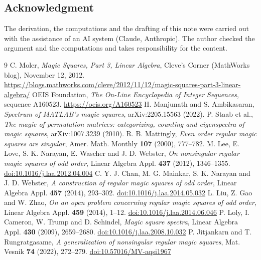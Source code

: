 \documentclass[11pt]{amsart}
\theoremstyle{remark}
\providecommand{\doi}[1]{\href{https://doi.org/#1}{doi:#1}}
\begin{document}
\subsection*{Acknowledgment}
The derivation, the computations and the drafting of this note were carried out with the assistance of an AI system
(Claude, Anthropic). The author checked the argument and the computations and takes responsibility for the content.

\begin{thebibliography}{9}
 C. Moler, \emph{Magic Squares, Part 3, Linear Algebra}, Cleve's Corner (MathWorks blog),
November 12, 2012. \url{https://blogs.mathworks.com/cleve/2012/11/12/magic-squares-part-3-linear-algebra/}
 OEIS Foundation, \emph{The On-Line Encyclopedia of Integer Sequences}, sequence A160523.
\url{https://oeis.org/A160523}
 H. Manjunath and S. Ambikasaran, \emph{Spectrum of MATLAB's magic squares},
arXiv:2205.15563 (2022).
 P. Staab et al., \emph{The magic of permutation matrices: categorizing, counting and eigenspectra
of magic squares}, arXiv:1007.3239 (2010).
 R. B. Mattingly, \emph{Even order regular magic squares are singular}, Amer. Math. Monthly
\textbf{107} (2000), 777--782.
 M. Lee, E. Love, S. K. Narayan, E. Wascher and J. D. Webster, \emph{On nonsingular regular magic
squares of odd order}, Linear Algebra Appl. \textbf{437} (2012), 1346--1355. \doi{10.1016/j.laa.2012.04.004}
 C. Y. J. Chan, M. G. Mainkar, S. K. Narayan and J. D. Webster, \emph{A construction of regular magic
squares of odd order}, Linear Algebra Appl. \textbf{457} (2014), 293--302. \doi{10.1016/j.laa.2014.05.032}
 L. Liu, Z. Gao and W. Zhao, \emph{On an open problem concerning regular magic squares of odd order},
Linear Algebra Appl. \textbf{459} (2014), 1--12. \doi{10.1016/j.laa.2014.06.046}
 P. Loly, I. Cameron, W. Trump and D. Schindel, \emph{Magic square spectra}, Linear Algebra Appl.
\textbf{430} (2009), 2659--2680. \doi{10.1016/j.laa.2008.10.032}
 P. Jitjankarn and T. Rungratgasame, \emph{A generalization of nonsingular regular magic squares},
Mat. Vesnik \textbf{74} (2022), 272--279. \doi{10.57016/MV-aqsi1967}
\end{thebibliography}
\end{document}
